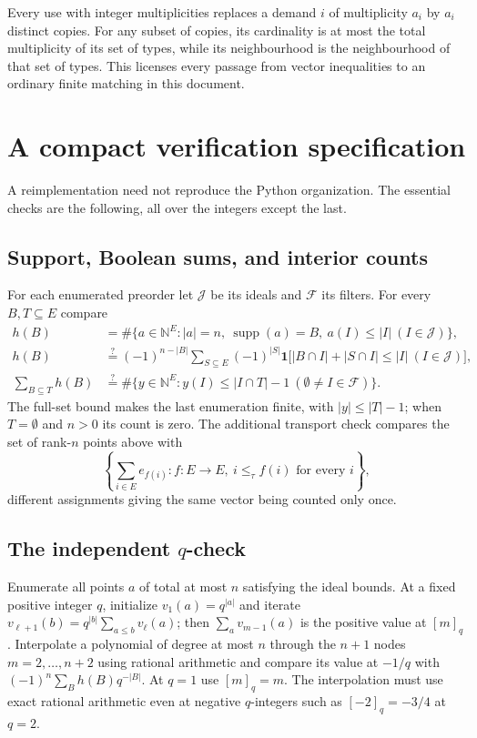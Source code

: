 \documentclass[11pt]{article}
\numberwithin{equation}{section}
\theoremstyle{definition}
\theoremstyle{remark}
\newcommand{\N}{\mathbb N}
\newcommand{\one}{\mathbf 1}
\newcommand{\supp}{\operatorname{supp}}
\newcommand{\qint}[1]{[#1]_q}
\begin{document}
Every use with integer multiplicities replaces a demand $i$ of multiplicity
$a_i$ by $a_i$ distinct copies. For any subset of copies, its cardinality is
at most the total multiplicity of its set of types, while its neighbourhood is
the neighbourhood of that set of types. This licenses every passage from
vector inequalities to an ordinary finite matching in this document.

\section{A compact verification specification}
\label{app:spec}

A reimplementation need not reproduce the Python organization. The essential
checks are the following, all over the integers except the last.

\subsection{Support, Boolean sums, and interior counts}

For each enumerated preorder let $\mathcal J$ be its ideals and $\mathcal F$
its filters. For every $B,T\subseteq E$ compare
\begin{align*}
 h(B)&=\#\{a\in\N^E:|a|=n,\ \supp(a)=B,
                         \ a(I)\le|I|\ (I\in\mathcal J)\},\\
 h(B)&\stackrel{?}{=}(-1)^{n-|B|}
      \sum_{S\subseteq E}(-1)^{|S|}
      \one\bigl[|B\cap I|+|S\cap I|\le|I|\ (I\in\mathcal J)\bigr],\\
 \sum_{B\subseteq T}h(B)&\stackrel{?}{=}
      \#\{y\in\N^E:y(I)\le|I\cap T|-1\ (\emptyset\ne I\in\mathcal F)\}.
\end{align*}
The full-set bound makes the last enumeration finite, with $|y|\le|T|-1$; when
$T=\emptyset$ and $n>0$ its count is zero. The additional transport check
compares the set of rank-$n$ points above with
\[
 \left\{\sum_{i\in E}e_{f(i)}:f:E\to E,\ i\le_\tau f(i)\text{ for every }i
 \right\},
\]
different assignments giving the same vector being counted only once.

\subsection{The independent \texorpdfstring{$q$}{q}-check}

Enumerate all points $a$ of total at most $n$ satisfying the ideal bounds. At
a fixed positive integer $q$, initialize $v_1(a)=q^{|a|}$ and iterate
$v_{\ell+1}(b)=q^{|b|}\sum_{a\le b}v_\ell(a)$; then $\sum_av_{m-1}(a)$ is the
positive value at $\qint m$. Interpolate a polynomial of degree at most $n$
through the $n+1$ nodes $m=2,\ldots,n+2$ using rational arithmetic and compare
its value at $-1/q$ with $(-1)^n\sum_Bh(B)q^{-|B|}$. At $q=1$ use
$\qint m=m$. The interpolation must use exact rational arithmetic even at
negative $q$-integers such as $\qint{-2}=-3/4$ at $q=2$.
\end{document}
